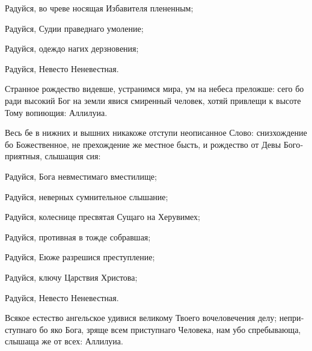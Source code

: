 \begin{russian}


  Радуйся, во чреве носящая Избавителя плененным;


  Радуйся, Судии праведнаго умоление;


  Радуйся, одеждо нагих дерзновения;


  Радуйся, Невесто Неневестная.


  \Ierei Странное рождество видевше, устранимся мира, ум на небеса преложше: сего бо ради высокий Бог на земли явися смиренный человек, хотяй привлещи к высоте Тому вопиющия: Аллилуиа.


  \Ierei Весь бе в нижних и вышних никакоже отступи неописанное Слово: снизхождение бо Божественное, не прехождение же местное бысть, и рождество от Девы Богоприятныя, слышащия сия:

  Радуйся, Бога невместимаго вместилище;


  Радуйся, неверных сумнительное слышание;


  Радуйся, колеснице пресвятая Сущаго на Херувимех;


  Радуйся, противная в тожде собравшая;


  Радуйся, Еюже разрешися преступление;


  Радуйся, ключу Царствия Христова;


  Радуйся, Невесто Неневестная.


  \Ierei Всякое естество ангельское удивися великому Твоего вочеловечения делу; неприступнаго бо яко Бога, зряще всем приступнаго Человека, нам убо спребывающа, слышаща же от всех: Аллилуиа.

\end{russian}

